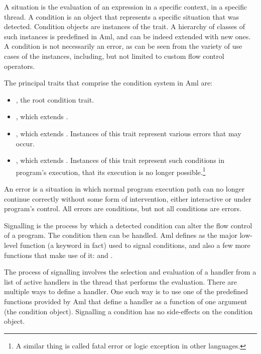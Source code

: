 A situation is the evaluation of an expression in a specific context, in a specific thread. A condition is an object that represents a specific situation that was detected. Condition objects are instances of the  trait. A hierarchy of classes of such instances is predefined in Aml, and can be indeed extended with new ones. A condition is not necessarily an error, as can be seen from the variety of use cases of the instances, including, but not limited to custom flow control operators. 

The principal traits that comprise the condition system in Aml are: 
\begin{itemize}
  \item {}, the root condition trait. 
  \item {}, which extends . 
  \item {}, which extends . Instances of this trait represent various errors that may occur. 
  \item {}, which extends . Instances of this trait represent such conditions in program's execution, that its execution is no longer possible.\footnote{A similar thing is called fatal error or logic exception in other languages.}
\end{itemize}

An error is a situation in which normal program execution path can no longer continue correctly without some form of intervention, either interactive or under program's control. All errors are conditions, but not all conditions are errors. 

Signalling is the process by which a detected condition can alter the flow control of a program. The condition then can be handled. Aml defines  as the major low-level function (a keyword in fact) used to signal conditions, and also a few more functions that make use of it:  and . 

The process of signalling involves the selection and evaluation of a handler from a list of active handlers in the thread that performs the evaluation. There are multiple ways to define a handler. One such way is to use one of the predefined functions provided by Aml that define a handler as a function of one argument (the condition object). Signalling a condition has no side-effects on the condition object. 

